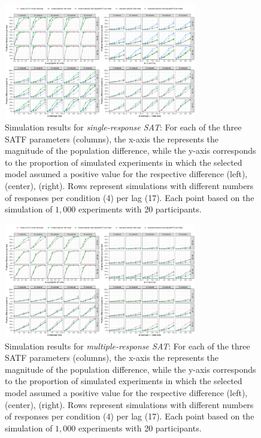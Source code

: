 \documentclass[10pt,letterpaper]{article}
\begin{document}
\begin{figure}
\centering
\includegraphics[width=0.75\textwidth]{../figures/results/results_sr.pdf} %
\caption{\label{fig:res_sr}Simulation results for \textit{single-response SAT}: For each of the three SATF parameters (columns), the x-axis the represents the magnitude of the population difference, while the y-axis corresponds to the proportion of simulated experiments in which the selected model assumed a positive value for the respective difference \protect{$\Delta\lambda$} (left),  (center), \protect{$\Delta\delta$} (right). Rows represent simulations with different numbers of responses per condition (4) per lag (17). Each point based on the simulation of $1,000$ experiments with 20 participants. }
\end{figure}

\begin{figure}
\centering
\includegraphics[width=0.75\textwidth]{../figures/results/results_mr.pdf} %
\caption{\label{fig:res_mr}Simulation results for \textit{multiple-response SAT}: For each of the three SATF parameters (columns), the x-axis the represents the magnitude of the population difference, while the y-axis corresponds to the proportion of simulated experiments in which the selected model assumed a positive value for the respective difference \protect{$\Delta\lambda$} (left),  (center), \protect{$\Delta\delta$} (right). Rows represent simulations with different numbers of responses per condition (4) per lag (17). Each point based on the simulation of $1,000$ experiments with 20 participants. }
\end{figure}
\end{document}
